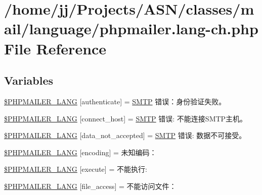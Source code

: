 \hypertarget{phpmailer_8lang-ch_8php}{}\section{/home/jj/\+Projects/\+A\+S\+N/classes/mail/language/phpmailer.lang-\/ch.php File Reference}
\label{phpmailer_8lang-ch_8php}
\subsection*{Variables}
\begin{DoxyCompactItemize}
\item 
\hyperlink{phpmailer_8lang-ch_8php_a2cb33073c989b85580748e331ed8b4aa}{\$\+P\+H\+P\+M\+A\+I\+L\+E\+R\+\_\+\+L\+A\+NG} \mbox{[}\textquotesingle{}authenticate\textquotesingle{}\mbox{]} = \textquotesingle{}\hyperlink{class_s_m_t_p}{S\+M\+TP} 错误：身份验证失败。\textquotesingle{}
\item 
\hyperlink{phpmailer_8lang-ch_8php_a2ee0cc637a06b96e45600db31c6799ee}{\$\+P\+H\+P\+M\+A\+I\+L\+E\+R\+\_\+\+L\+A\+NG} \mbox{[}\textquotesingle{}connect\+\_\+host\textquotesingle{}\mbox{]} = \textquotesingle{}\hyperlink{class_s_m_t_p}{S\+M\+TP} 错误\+: 不能连接\+S\+M\+T\+P主机。\textquotesingle{}
\item 
\hyperlink{phpmailer_8lang-ch_8php_a814c6b191205d2361b3233e9c9d6fda5}{\$\+P\+H\+P\+M\+A\+I\+L\+E\+R\+\_\+\+L\+A\+NG} \mbox{[}\textquotesingle{}data\+\_\+not\+\_\+accepted\textquotesingle{}\mbox{]} = \textquotesingle{}\hyperlink{class_s_m_t_p}{S\+M\+TP} 错误\+: 数据不可接受。\textquotesingle{}
\item 
\hyperlink{phpmailer_8lang-ch_8php_a817f7283f3d54c970a0c10305cc668cc}{\$\+P\+H\+P\+M\+A\+I\+L\+E\+R\+\_\+\+L\+A\+NG} \mbox{[}\textquotesingle{}encoding\textquotesingle{}\mbox{]} = \textquotesingle{}未知编码：\textquotesingle{}
\item 
\hyperlink{phpmailer_8lang-ch_8php_a668217a9563a168f30f2a8548b6ed5a9}{\$\+P\+H\+P\+M\+A\+I\+L\+E\+R\+\_\+\+L\+A\+NG} \mbox{[}\textquotesingle{}execute\textquotesingle{}\mbox{]} = \textquotesingle{}不能执行\+: \textquotesingle{}
\item 
\hyperlink{phpmailer_8lang-ch_8php_a7e83349023b856ef9e5c46e30ae6d51e}{\$\+P\+H\+P\+M\+A\+I\+L\+E\+R\+\_\+\+L\+A\+NG} \mbox{[}\textquotesingle{}file\+\_\+access\textquotesingle{}\mbox{]} = \textquotesingle{}不能访问文件：\textquotesingle{}
\item 

\end{DoxyCompactItemize}
